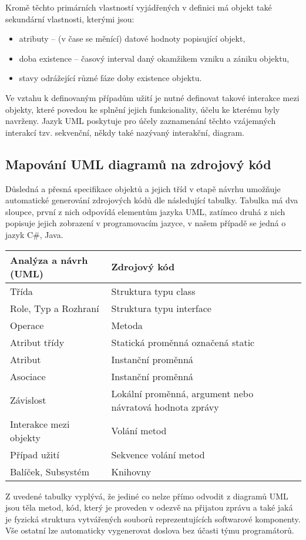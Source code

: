 Kromě těchto primárních vlastností vyjádřených v definici má objekt také sekundární vlastnosti, kterými jsou: 
\begin{itemize}
\item atributy -- (v čase se měnící) datové hodnoty popisující objekt, 
\item doba existence -- časový interval daný okamžikem vzniku a zániku objektu, 
\item stavy odrážející různé fáze doby existence objektu.
\end{itemize}

Ve vztahu k definovaným případům užití je nutné  definovat takové interakce mezi objekty, které povedou ke splnění jejich funkcionality, účelu ke kterému byly navrženy. Jazyk UML poskytuje pro účely zaznamenání těchto vzájemných interakcí tzv. sekvenční, někdy také nazývaný interakční, diagram.

\subsection{Mapování UML diagramů na zdrojový kód}
Důsledná a přesná specifikace objektů a jejich tříd v etapě návrhu umožňuje automatické generování zdrojových kódů dle následující tabulky. Tabulka má dva sloupce, první z nich odpovídá elementům jazyka UML, zatímco druhá z nich popisuje jejich zobrazení v programovacím jazyce, v našem případě se jedná o jazyk C\#, Java.
\begin{table}[h!]
\centering
\begin{tabular}{l | l}
\hline
\textbf{Analýza a návrh (UML)} & \textbf{Zdrojový kód} \\
\hline
Třída &  Struktura typu class \\
Role, Typ a Rozhraní& Struktura typu interface\\
Operace & Metoda\\
Atribut třídy & Statická proměnná označená static\\
Atribut & Instanční proměnná\\
Asociace & Instanční proměnná\\
Závislost & Lokální proměnná, argument nebo návratová hodnota zprávy\\
Interakce mezi objekty & Volání metod\\
Případ užití & Sekvence volání metod\\
Balíček, Subsystém & Knihovny \\
\hline
\end{tabular}
\end{table}
Z uvedené tabulky vyplývá, že jediné co nelze přímo odvodit z diagramů UML jsou těla metod, kód, který je proveden v odezvě na přijatou zprávu a také jaká je fyzická struktura vytvářených souborů reprezentujících softwarové komponenty. Vše ostatní lze automaticky vygenerovat doslova bez účasti týmu programátorů.

